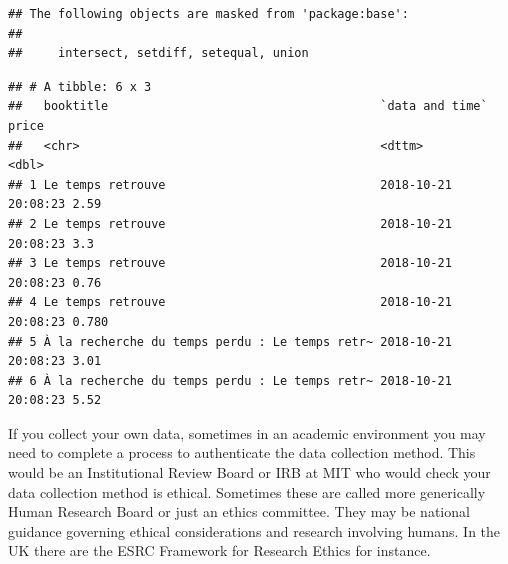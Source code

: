 \documentclass[]{book}
\newenvironment{Shaded}{\begin{snugshade}}{\end{snugshade}}
\newcommand{\KeywordTok}[1]{\textcolor[rgb]{0.13,0.29,0.53}{\textbf{#1}}}
\newcommand{\StringTok}[1]{\textcolor[rgb]{0.31,0.60,0.02}{#1}}
\newcommand{\OperatorTok}[1]{\textcolor[rgb]{0.81,0.36,0.00}{\textbf{#1}}}
\newcommand{\NormalTok}[1]{#1}
\theoremstyle{definition}
\theoremstyle{definition}
\theoremstyle{definition}
\theoremstyle{remark}
\begin{document}
\begin{verbatim}
## The following objects are masked from 'package:base':
## 
##     intersect, setdiff, setequal, union
\end{verbatim}

\begin{Shaded}
\end{Shaded}

\begin{verbatim}
## # A tibble: 6 x 3
##   booktitle                                      `data and time`     price
##   <chr>                                          <dttm>              <dbl>
## 1 Le temps retrouve                              2018-10-21 20:08:23 2.59 
## 2 Le temps retrouve                              2018-10-21 20:08:23 3.3  
## 3 Le temps retrouve                              2018-10-21 20:08:23 0.76 
## 4 Le temps retrouve                              2018-10-21 20:08:23 0.780
## 5 À la recherche du temps perdu : Le temps retr~ 2018-10-21 20:08:23 3.01 
## 6 À la recherche du temps perdu : Le temps retr~ 2018-10-21 20:08:23 5.52
\end{verbatim}

If you collect your own data, sometimes in an academic environment you
may need to complete a process to authenticate the data collection
method. This would be an Institutional Review Board or IRB at MIT who
would check your data collection method is ethical. Sometimes these are
called more generically Human Research Board or just an ethics
committee. They may be national guidance governing ethical
considerations and research involving humans. In the UK there are the
ESRC Framework for Research Ethics for instance.
\end{document}
